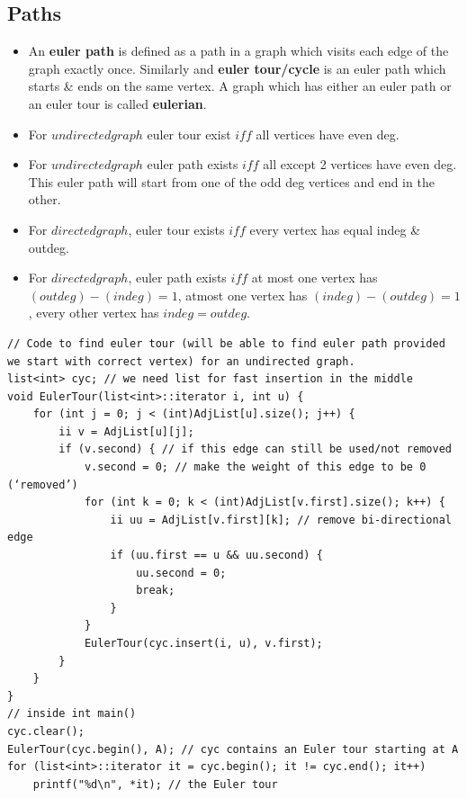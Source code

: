 \documentclass[8pt, a4paper, oneside, twocolumn]{extarticle}
\begin{document}
\subsection{Paths}
\begin{itemize}
    \item An \textbf{euler path} is defined as a path in a graph which visits each edge of the graph exactly once. Similarly and \textbf{euler tour/cycle }is an euler path which starts \& ends on the same vertex. A graph which has either an euler path or an euler tour is called \textbf{eulerian}.
    \item For $undirected graph$ euler tour exist $iff$ all vertices have even deg.
    \item For $undirected graph$ euler path exists $iff$ all except 2 vertices have even deg. This euler path will start from one of the odd deg vertices and end in the other.
    \item For $directed graph$, euler tour exists $iff$ every vertex has equal indeg \& outdeg.
    \item For $directed graph$, euler path exists $iff$ at most one vertex has $(outdeg) - (indeg) = 1$, atmost one vertex has $(indeg) - (outdeg) = 1$, every other vertex has $indeg = outdeg$.
\end{itemize}
\begin{verbatim}
// Code to find euler tour (will be able to find euler path provided we start with correct vertex) for an undirected graph.
list<int> cyc; // we need list for fast insertion in the middle
void EulerTour(list<int>::iterator i, int u) {
    for (int j = 0; j < (int)AdjList[u].size(); j++) {
        ii v = AdjList[u][j];
        if (v.second) { // if this edge can still be used/not removed
            v.second = 0; // make the weight of this edge to be 0 (‘removed’)
            for (int k = 0; k < (int)AdjList[v.first].size(); k++) {
                ii uu = AdjList[v.first][k]; // remove bi-directional edge
                if (uu.first == u && uu.second) {
                    uu.second = 0;
                    break;
                } 
            }
            EulerTour(cyc.insert(i, u), v.first);
        } 
    }
}
// inside int main()
cyc.clear();
EulerTour(cyc.begin(), A); // cyc contains an Euler tour starting at A
for (list<int>::iterator it = cyc.begin(); it != cyc.end(); it++)
    printf("%d\n", *it); // the Euler tour
\end{verbatim}
\end{document}
